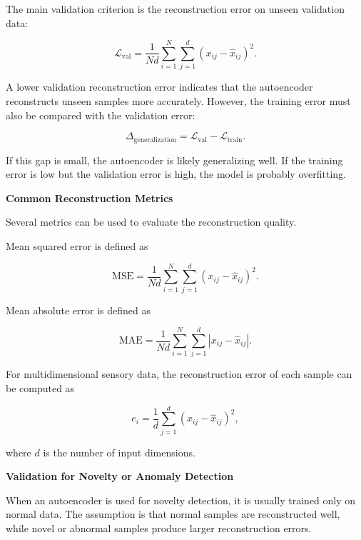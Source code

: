 \documentclass{book}
\providecommand{\ProjectDeepHeading}[2]{%
    \par\medskip\noindent\textbf{#2}\par\smallskip
}
\begin{document}
        The main validation criterion is the reconstruction error on unseen validation data:
        
        \[
            \mathcal{L}_{\mathrm{val}}
            =
            \frac{1}{Nd}
            \sum_{i=1}^{N}
            \sum_{j=1}^{d}
            (x_{ij}-\hat{x}_{ij})^2.
        \]
        
        A lower validation reconstruction error indicates that the autoencoder reconstructs unseen samples more accurately.
        However, the training error must also be compared with the validation error:
        
        \[
            \ensuremath{\Delta}_{\mathrm{generalization}}
            =
            \mathcal{L}_{\mathrm{val}}
            -
            \mathcal{L}_{\mathrm{train}}.
        \]
        
        If this gap is small, the autoencoder is likely generalizing well.
        If the training error is low but the validation error is high, the model is probably overfitting.
    
    
    \ProjectDeepHeading{4}{Common Reconstruction Metrics}
        
        Several metrics can be used to evaluate the reconstruction quality.
        
        Mean squared error is defined as
        
        \[
            \mathrm{MSE}
            =
            \frac{1}{Nd}
            \sum_{i=1}^{N}
            \sum_{j=1}^{d}
            (x_{ij}-\hat{x}_{ij})^2.
        \]
        
        Mean absolute error is defined as
        
        \[
            \mathrm{MAE}
            =
            \frac{1}{Nd}
            \sum_{i=1}^{N}
            \sum_{j=1}^{d}
            \left|x_{ij}-\hat{x}_{ij}\right|.
        \]
        
        For multidimensional sensory data, the reconstruction error of each sample can be computed as
        
        \[
            e_i
            =
            \frac{1}{d}
            \sum_{j=1}^{d}
            (x_{ij}-\hat{x}_{ij})^2,
        \]
        
        where \(d\) is the number of input dimensions.
    
    
    \ProjectDeepHeading{4}{Validation for Novelty or Anomaly Detection}
        
        When an autoencoder is used for novelty detection, it is usually trained only on normal data.
        The assumption is that normal samples are reconstructed well, while novel or abnormal samples produce larger reconstruction errors.
        
\end{document}
